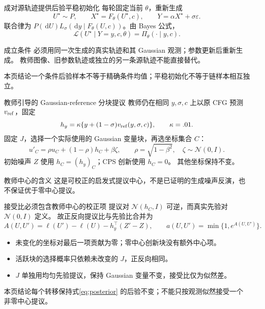 \documentclass[10pt,aspectratio=169]{beamer}
\newcommand{\N}{\mathcal N}
\newcommand{\dd}{\,\mathrm d}
\newcommand{\takeaway}[1]{\begin{exampleblock}{本页结论}\small #1\end{exampleblock}}
\begin{document}
\begin{frame}{成对源轨迹提供后验平稳初始化}
\small
每轮固定当前 $\theta$，重新生成
\begin{equation}
U^\star\sim P,\qquad X^\star=F_\theta(U^\star,c),\qquad
Y=\alpha X^\star+\sigma\varepsilon.
\end{equation}
联合律为 $P(\dd U)L_\sigma(\dd y\mid F_\theta(U,c))$。由 Bayes 公式，
\begin{equation}\label{eq:paired-stationary}
\mathcal L(U^\star\mid Y=y,c,\theta)=\Pi_\theta(\cdot\mid y,c).
\end{equation}
\begin{block}{成立条件}
必须用\alert{同一次生成的真实轨迹}和其 Gaussian 观测；参数更新后重新生成。
教师图像、旧参数轨迹或独立的另一条源轨迹不能直接替代。
\end{block}
\takeaway{一个条件后验样本不等于精确条件均值；平稳初始化不等于链样本相互独立。}
\end{frame}

\begin{frame}{教师引导的 Gaussian-reference 分块提议}
\small
教师仍在相同 $y,\sigma,c$ 上以原 CFG 预测 $v_{\rm ref}$，固定
\begin{equation}
h_y=\kappa\{y+(1-\sigma)v_{\rm ref}(y,\sigma,c)\},\qquad\kappa=.01.
\end{equation}
固定 $J$，选择一个实际使用的 Gaussian 变量块，再选坐标集合 $C$：
\begin{equation}\label{eq:pcn}
u'_C=\rho u_C+(1-\rho)h_C+\beta\zeta,\qquad
\rho=\sqrt{1-\beta^2},\quad\zeta\sim\N(0,I).
\end{equation}
初始噪声 $Z$ 使用 $h_C=(h_y)_C$；CPS 创新使用 $h_C=0$。
其他坐标保持不变。
\begin{alertblock}{教师中心的含义}
这是可校正的启发式提议中心，不是已证明的生成噪声反演，也不保证优于零中心提议。
\end{alertblock}
\end{frame}

\begin{frame}{接受比必须包含教师中心的校正项}
\small
提议对 $\N(h_C,I)$ 可逆，而真实先验对 $\N(0,I)$ 定义。
故正反向提议比与先验比合并为
\begin{equation}\label{eq:mh-accept}
A(U,U')=\ell(U')-\ell(U)-h_y^\top(Z'-Z),\qquad
a(U,U')=\min\{1,e^{A(U,U')}\}.
\end{equation}
\begin{itemize}\itemsep3pt
\item 未变化的坐标对最后一项贡献为零；零中心创新块没有额外中心项。
\item 活跃块的选择概率只依赖\alert{未改变的} $J$，正反向相同。
\item $J$ 单独用均匀先验提议，保持 Gaussian 变量不变，接受比仅为似然差。
\end{itemize}
\takeaway{每个转移保持式\eqref{eq:posterior} 的后验不变；不能只按观测似然接受一个非零中心提议。}
\end{frame}
\end{document}
